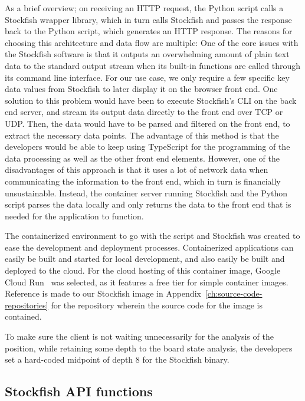As a brief overview; on receiving an HTTP request, the Python script calls a Stockfish wrapper library,
which in turn calls Stockfish and passes the response back to the Python script, which generates an HTTP response.
The reasons for choosing this architecture and data flow are multiple:
One of the core issues with the Stockfish software is that it outputs an overwhelming amount of plain text data to the
standard output stream when its built-in functions are called through its command line interface.
For our use case, we only require a few specific key data values from Stockfish to later display it on the browser front
end.
One solution to this problem would have been to execute Stockfish's CLI on the back end server, and stream its output
data directly to the front end over TCP or UDP\@.
Then, the data would have to be parsed and filtered on the front end, to extract the necessary data points.
The advantage of this method is that the developers would be able to keep using TypeScript for the programming of the
data processing as well as the other front end elements.
However, one of the disadvantages of this approach is that it uses a lot of network data when communicating the
information to the front end, which in turn is financially unsustainable.
Instead, the container server running Stockfish and the Python script parses the data locally and only returns the data
to the front end that is needed for the application to function.

The containerized environment to go with the script and Stockfish was created to ease the development and deployment
processes.
Containerized applications can easily be built and started for local development, and also easily be built and deployed
to the cloud.
For the cloud hosting of this container image, Google Cloud Run~\cite{google-cloud-run} was selected, as it features
a free tier for simple container images.
Reference is made to our Stockfish image in Appendix~\ref{ch:source-code-repositories} for the repository wherein the
source code for the image is contained.

To make sure the client is not waiting unnecessarily for the analysis of the position, while retaining some depth to the
board state analysis, the developers set a hard-coded midpoint of depth 8 for the Stockfish binary.

\subsection{Stockfish API functions}\label{subsec:stockfish-api-functions}

